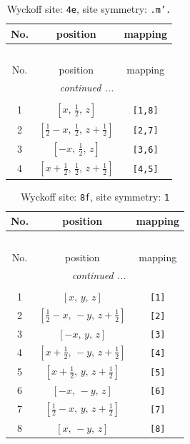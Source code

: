 \documentclass[fleqn,8pt]{jsarticle}
\begin{document}
\renewcommand{\arraystretch}{1.2}
\begin{longtable}{ccc}
\caption{Wyckoff site: {\tt 4e}, site symmetry: {\tt .m'.}}
 \\
 \hline \hline
No. & position & mapping \\ \hline \endfirsthead

\multicolumn{2}{l}{\tablename\ \thetable{}} \\
 \hline \hline
No. & position & mapping \\ \hline \endhead

 \hline \hline
\multicolumn{2}{r}{\footnotesize\it continued ...} \\ \endfoot

 \hline \hline
\multicolumn{2}{r}{} \\ \endlastfoot

1 & $\left[ x,\, \frac{1}{2},\, z \right]$ & {\tt [1,8]} \\ \hline
2 & $\left[ \frac{1}{2} - x,\, \frac{1}{2},\, z + \frac{1}{2} \right]$ & {\tt [2,7]} \\ \hline
3 & $\left[ - x,\, \frac{1}{2},\, z \right]$ & {\tt [3,6]} \\ \hline
4 & $\left[ x + \frac{1}{2},\, \frac{1}{2},\, z + \frac{1}{2} \right]$ & {\tt [4,5]} \\
\end{longtable}
\renewcommand{\arraystretch}{1.2}
\begin{longtable}{ccc}
\caption{Wyckoff site: {\tt 8f}, site symmetry: {\tt 1}}
 \\
 \hline \hline
No. & position & mapping \\ \hline \endfirsthead

\multicolumn{2}{l}{\tablename\ \thetable{}} \\
 \hline \hline
No. & position & mapping \\ \hline \endhead

 \hline \hline
\multicolumn{2}{r}{\footnotesize\it continued ...} \\ \endfoot

 \hline \hline
\multicolumn{2}{r}{} \\ \endlastfoot

1 & $\left[ x,\, y,\, z \right]$ & {\tt [1]} \\ \hline
2 & $\left[ \frac{1}{2} - x,\, - y,\, z + \frac{1}{2} \right]$ & {\tt [2]} \\ \hline
3 & $\left[ - x,\, y,\, z \right]$ & {\tt [3]} \\ \hline
4 & $\left[ x + \frac{1}{2},\, - y,\, z + \frac{1}{2} \right]$ & {\tt [4]} \\ \hline
5 & $\left[ x + \frac{1}{2},\, y,\, z + \frac{1}{2} \right]$ & {\tt [5]} \\ \hline
6 & $\left[ - x,\, - y,\, z \right]$ & {\tt [6]} \\ \hline
7 & $\left[ \frac{1}{2} - x,\, y,\, z + \frac{1}{2} \right]$ & {\tt [7]} \\ \hline
8 & $\left[ x,\, - y,\, z \right]$ & {\tt [8]} \\
\end{longtable}
\end{document}
